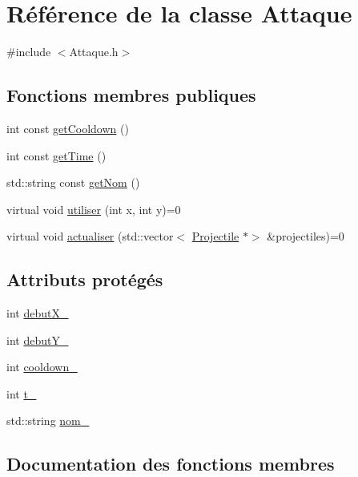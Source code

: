 \hypertarget{class_attaque}{}\section{Référence de la classe Attaque}
\label{class_attaque}


{\ttfamily \#include $<$Attaque.\+h$>$}

\subsection*{Fonctions membres publiques}
\begin{DoxyCompactItemize}
\item 
int const \hyperlink{class_attaque_a7b220e885016c73f4631b8130bd9bc4a}{get\+Cooldown} ()
\item 
int const \hyperlink{class_attaque_aeba93e1b165ac146ca037e35689c707d}{get\+Time} ()
\item 
std\+::string const \hyperlink{class_attaque_a5a56f274de25d8743e651ce20134098a}{get\+Nom} ()
\item 
virtual void \hyperlink{class_attaque_ac1a7c6cafb2b3b3f6530dbcce2b8ce4b}{utiliser} (int x, int y)=0
\item 
virtual void \hyperlink{class_attaque_a016095c9deefd43afc6e9f1a162b311f}{actualiser} (std\+::vector$<$ \hyperlink{class_projectile}{Projectile} $\ast$$>$ \&projectiles)=0
\end{DoxyCompactItemize}
\subsection*{Attributs protégés}
\begin{DoxyCompactItemize}
\item 
int \hyperlink{class_attaque_a896f857ac3e9c58f9298b129dcdac221}{debut\+X\+\_\+}
\item 
int \hyperlink{class_attaque_ae5b5250a0d4203db058f21e91d1c0b5f}{debut\+Y\+\_\+}
\item 
int \hyperlink{class_attaque_a6f1609c2d6c4ffa5016c9f094c1c2cc7}{cooldown\+\_\+}
\item 
int \hyperlink{class_attaque_adcf78793a4bb4ac9c1928615e0aea112}{t\+\_\+}
\item 
std\+::string \hyperlink{class_attaque_ad3028f07f65f69a371f159f89a0c82a9}{nom\+\_\+}
\end{DoxyCompactItemize}


\subsection{Documentation des fonctions membres}
\mbox{\label{class_attaque_a016095c9deefd43afc6e9f1a162b311f}} 
